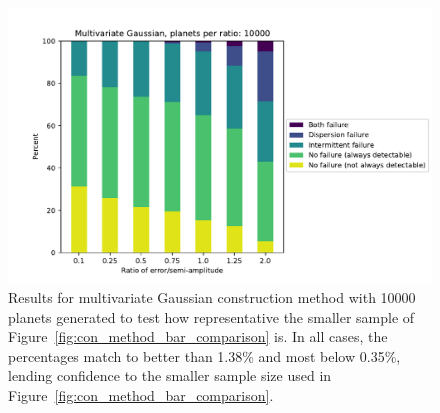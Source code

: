 \begin{figure}[htpb]
    \centering
    \includegraphics[width=\linewidth]{ch1/figures/total_bar_plot.pdf} 
    \caption{Results for multivariate Gaussian construction method with 10000 planets generated to
        test how representative the smaller sample of Figure~\ref{fig:con_method_bar_comparison} is.
        In all cases, the percentages match to better than 1.38\% and most below 0.35\%, lending confidence to the smaller
        sample size used in Figure~\ref{fig:con_method_bar_comparison}.}%
    \label{fig:bar_plot}
\end{figure}
